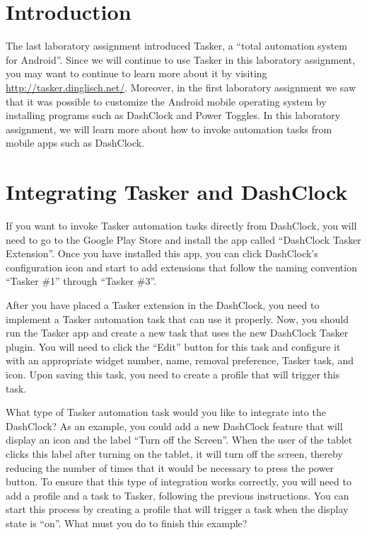 

\usepackage[compact]{titlesec}



\section*{Introduction}

The last laboratory assignment introduced Tasker, a ``total automation system for Android''.  Since we will continue to
use Tasker in this laboratory assignment, you may want to continue to learn more about it by visiting
\url{http://tasker.dinglisch.net/}. Moreover, in the first laboratory assignment we saw that it was possible to
customize the Android mobile operating system by installing programs such as DashClock and Power Toggles.  In this
laboratory assignment, we will learn more about how to invoke automation tasks from mobile apps such as DashClock.

\section*{Integrating Tasker and DashClock}

If you want to invoke Tasker automation tasks directly from DashClock, you will need to go to the Google Play Store and
install the app called ``DashClock Tasker Extension''.  Once you have installed this app, you can click DashClock's
configuration icon and start to add extensions that follow the naming convention ``Tasker \#1'' through ``Tasker \#3''.


After you have placed a Tasker extension in the DashClock, you need to implement a Tasker automation task that can use
it properly.  Now, you should run the Tasker app and create a new task that uses the new DashClock Tasker plugin.  You
will need to click the ``Edit'' button for this task and configure it with an appropriate widget number, name, removal
preference, Tasker task, and icon. Upon saving this task, you need to create a profile that will trigger this task.

What type of Tasker automation task would you like to integrate into the DashClock?  As an example, you could add a new
DashClock feature that will display an icon and the label ``Turn off the Screen''.  When the user of the tablet clicks
this label after turning on the tablet, it will turn off the screen, thereby reducing the number of times that it would
be necessary to press the power button.  To ensure that this type of integration works correctly, you will need to add a
profile and a task to Tasker, following the previous instructions.  You can start this process by creating a profile
that will trigger a task when the display state is ``on''.  What must you do to finish this example?

